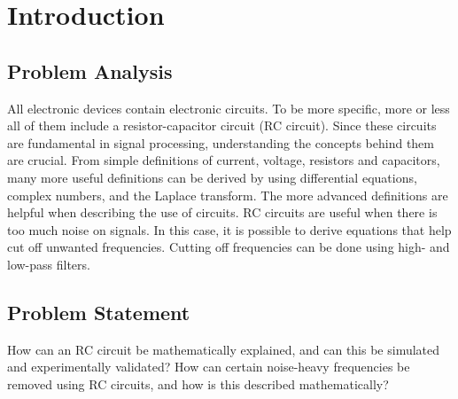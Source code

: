 \chapter{Introduction}
\section{Problem Analysis}
All electronic devices contain electronic circuits. To be more specific, more or less all of them include a resistor-capacitor circuit (RC circuit). Since these circuits are fundamental in signal processing, understanding the concepts behind them are crucial. From simple definitions of current, voltage, resistors and capacitors, many more useful definitions can be derived by using differential equations, complex numbers, and the Laplace transform. The more advanced definitions are helpful when describing the use of circuits. RC circuits are useful when there is too much noise on signals. In this case, it is possible to derive equations that help cut off unwanted frequencies. Cutting off frequencies can be done using high- and low-pass filters. 

\section{Problem Statement}

How can an RC circuit be mathematically explained, and can this be simulated and experimentally validated? How can certain noise-heavy frequencies be removed using RC circuits, and how is this described mathematically?